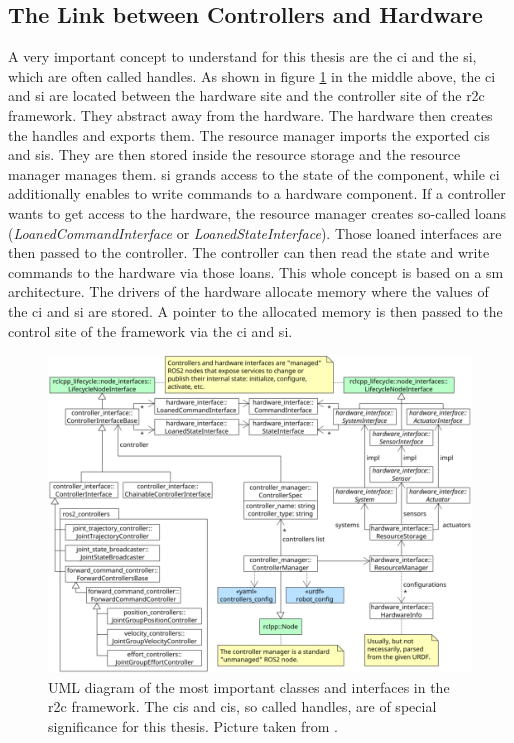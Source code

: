 \subsection{The Link between Controllers and Hardware}\label{c3_sec_link_ctrl_hw}
A very important concept to understand for this thesis are the \gls{ci} and the \gls{si}, which are often called \glspl{handle}. As shown in figure \ref{c3_fig_ros2_control_uml} in the middle above, the \gls{ci} and \gls{si} are located between the hardware site and the controller site of the \gls{r2c} framework. They abstract away from the hardware. The hardware then creates the \glspl{handle} and exports them. The resource manager imports the exported \glspl{ci} and \glspl{si}. They are then stored inside the resource storage and the resource manager manages them. \gls{si} grands access to the state of the component, while \gls{ci} additionally enables to write commands to a hardware component. If a controller wants to get access to the hardware, the resource manager creates so-called loans (\textit{LoanedCommandInterface} or \textit{LoanedStateInterface}). Those loaned interfaces are then passed to the controller. The controller can then read the state and write commands to the hardware via those loans.\newline
This whole concept is based on a \gls{sm} architecture. The drivers of the hardware allocate memory where the values of the \gls{ci} and \gls{si} are stored. A pointer to the allocated memory is then passed to the control site of the framework via the \gls{ci} and \gls{si}. 
\begin{figure}[htbp]
	\centering
	\includegraphics[width=1\textwidth]{Figures/c3/ros2_control_uml.png}
	\caption{UML diagram of the most important classes and interfaces in the \gls{r2c} framework. The \glspl{ci} and \glspl{ci}, so called \glspl{handle}, are of special significance for this thesis. Picture taken from \cite{noauthor_welcome_nodate}. }
	\label{c3_fig_ros2_control_uml}
\end{figure}
 
